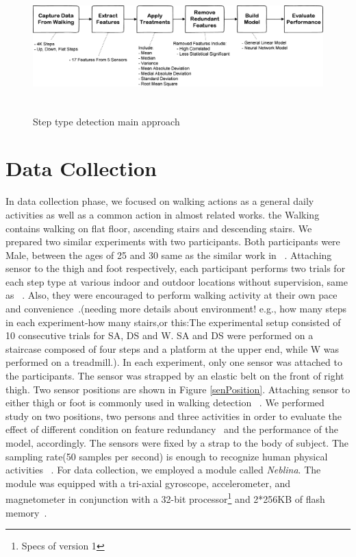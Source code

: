 \begin{figure}
\includegraphics[height=2in, width=6.6in]{approach.eps}
\caption{Step type detection main approach}
\label{secFig1}
\end{figure}

\section{Data Collection}

In data collection phase, we focused on walking actions as a general daily activities as well as a common action in almost related works. the Walking contains walking on flat floor, ascending stairs and descending stairs.  We prepared two similar experiments with two participants. Both participants were Male, between the ages of 25 and 30 same as the similar work in ~\cite{s140610146}. Attaching sensor to the thigh and foot respectively, each participant performs two trials for each step type at various indoor and outdoor locations without supervision, same as ~\cite{zhang2011feature}. Also, they were encouraged to perform walking activity at their own pace and convenience~\cite{yong2013human}.(needing more details about environment! e.g., how many steps in each experiment-how many stairs,or this:The experimental setup consisted of 10 consecutive trials for SA, DS and W. SA and DS were performed on a staircase composed of four steps and a platform at the upper end, while W was performed on a treadmill.). In each experiment, only one sensor was attached to the participants. The sensor was strapped by an elastic belt on the front of right thigh.  Two sensor positions are shown in Figure \ref{senPosition}. Attaching sensor to either thigh or foot is commonly used in walking detection ~\cite{CAV:CAV2}. We performed study on two positions, two persons and three activities in order to evaluate the effect of different condition on feature redundancy~\cite{zhang2011feature} and the performance of the model, accordingly. The sensors were fixed by a strap to the body of subject. The sampling rate(50 samples per second) is enough to recognize human physical activities ~\cite{6726194}.
For data collection, we employed a module called \textit{Neblina}. The module was equipped with a tri-axial gyroscope, accelerometer, and magnetometer in conjunction with a 32-bit processor\footnote{Specs of version 1} and 2*256KB of flash memory~\cite{ProMotio87:online}.

